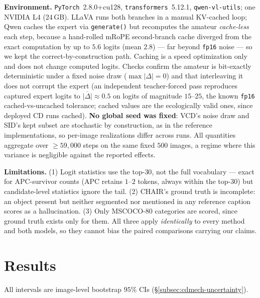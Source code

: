 \documentclass{article}
\begin{document}
\textbf{Environment.} \texttt{PyTorch}~2.8.0+cu128,
\texttt{transformers}~5.12.1, \texttt{qwen-vl-utils}; one NVIDIA L4 (24\,GB).
LLaVA runs both branches in a manual KV-cached loop; Qwen caches the expert via
\texttt{generate()} but recomputes the amateur \emph{cache-less} each step,
because a hand-rolled mRoPE second-branch cache diverged from the exact
computation by up to $5.6$ logits (mean $2.8$) --- far beyond \texttt{fp16}
noise --- so we kept the correct-by-construction path. Caching is a speed
optimization only and does not change computed logits. Checks confirm the
amateur is bit-exactly deterministic under a fixed noise draw
($\max|\Delta|=0$) and that interleaving it does not corrupt the expert (an
independent teacher-forced pass reproduces captured expert logits to
$\overline{|\Delta|}\approx0.5$ on logits of magnitude $15$--$25$, the known
\texttt{fp16} cached-vs-uncached tolerance; cached values are the ecologically
valid ones, since deployed CD runs cached). \textbf{No global seed was fixed}:
VCD's noise draw and SID's kept subset are stochastic by construction, as in the
reference implementations, so per-image realizations differ across runs. All
quantities aggregate over $\ge59{,}000$ steps on the same fixed $500$ images, a
regime where this variance is negligible against the reported effects.

\textbf{Limitations.} (1) Logit statistics use the top-$30$, not the full
vocabulary --- exact for APC-survivor counts (APC retains $1$--$2$ tokens,
always within the top-$30$) but candidate-level statistics ignore the tail.
(2) CHAIR's ground truth is incomplete: an object present but neither segmented
nor mentioned in any reference caption scores as a hallucination. (3) Only
MSCOCO-80 categories are scored, since ground truth exists only for them. All
three apply \emph{identically} to every method and both models, so they cannot
bias the paired comparisons carrying our claims.


\section{Results}
\label{sec:cdmech-results}

All intervals are image-level bootstrap $95\%$ CIs (\S\ref{subsec:cdmech-uncertainty}).
\end{document}
